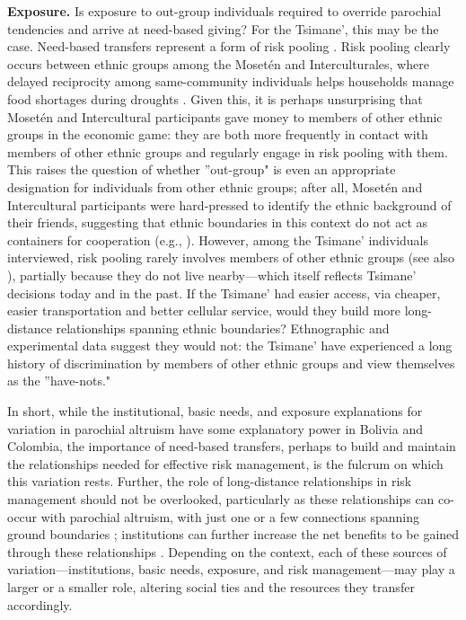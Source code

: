 \documentclass[bibauthoryear]{aa}
\begin{document}
\textbf{Exposure.} Is exposure to out-group individuals required to override parochial tendencies and arrive at need-based giving? For the Tsimane', this may be the case. Need-based transfers represent a form of risk pooling \citep{cronk2019managing}. Risk pooling clearly occurs between ethnic groups among the Moset\'en and Interculturales, where delayed reciprocity among same-community individuals helps households manage food shortages during droughts \citep{pisorjones2020}. Given this, it is perhaps unsurprising that Moset\'en and Intercultural participants gave money to members of other ethnic groups in the economic game: they are both more frequently in contact with members of other ethnic groups and regularly engage in risk pooling with them. This raises the question of whether ''out-group" is even an appropriate designation for individuals from other ethnic groups; after all, Moset\'en and Intercultural participants were hard-pressed to identify the ethnic background of their friends, suggesting that ethnic boundaries in this context do not act as containers for cooperation (e.g., \citep{brewer1976ethnocentrism, moya2015different}). However, among the Tsimane' individuals interviewed, risk pooling rarely involves members of other ethnic groups (see also \citep{jaeggi2016reciprocal}), partially because they do not live nearby---which itself reflects Tsimane' decisions today and in the past. If the Tsimane' had easier access, via cheaper, easier transportation and better cellular service, would they build more long-distance relationships spanning ethnic boundaries? Ethnographic and experimental data suggest they would not: the Tsimane' have experienced a long history of discrimination by members of other ethnic groups and view themselves as the ''have-nots."

In short, while the institutional, basic needs, and exposure explanations for variation in parochial altruism have some explanatory power in Bolivia and Colombia, the importance of need-based transfers, perhaps to build and maintain the relationships needed for effective risk management, is the fulcrum on which this variation rests. Further, the role of long-distance relationships in risk management should not be overlooked, particularly as these relationships can co-occur with parochial altruism, with just one or a few connections spanning ground boundaries \citep{bollig1993intra, brewer1976ethnocentrism, lathrap1973antiquity, bowles2004persistent}; institutions can further increase the net benefits to be gained through these relationships \citep{pisor2019evolution}. Depending on the context, each of these sources of variation---institutions, basic needs, exposure, and risk management---may play a larger or a smaller role, altering social ties and the resources they transfer accordingly.
\end{document}
